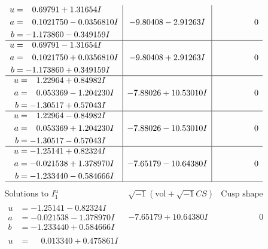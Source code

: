 \documentclass[1p]{elsarticle_modified}
\theoremstyle{definition}
\newcommand{\I}{\sqrt{-1}}
\begin{document}
$$\begin{array}{c|c|c}
\begin{aligned}
u &= \phantom{-}0.69791 + 1.31654 I \\
a &= \phantom{-}0.1021750 - 0.0356810 I \\
b &= -1.173860 - 0.349159 I\end{aligned}
 & -9.80408 - 2.91263 I & \phantom{-0.000000 } 0 \\ \hline\begin{aligned}
u &= \phantom{-}0.69791 - 1.31654 I \\
a &= \phantom{-}0.1021750 + 0.0356810 I \\
b &= -1.173860 + 0.349159 I\end{aligned}
 & -9.80408 + 2.91263 I & \phantom{-0.000000 } 0 \\ \hline\begin{aligned}
u &= \phantom{-}1.22964 + 0.84982 I \\
a &= \phantom{-}0.053369 - 1.204230 I \\
b &= -1.30517 + 0.57043 I\end{aligned}
 & -7.88026 + 10.53010 I & \phantom{-0.000000 } 0 \\ \hline\begin{aligned}
u &= \phantom{-}1.22964 - 0.84982 I \\
a &= \phantom{-}0.053369 + 1.204230 I \\
b &= -1.30517 - 0.57043 I\end{aligned}
 & -7.88026 - 10.53010 I & \phantom{-0.000000 } 0 \\ \hline\begin{aligned}
u &= -1.25141 + 0.82324 I \\
a &= -0.021538 + 1.378970 I \\
b &= -1.233440 - 0.584666 I\end{aligned}
 & -7.65179 - 10.64380 I & \phantom{-0.000000 } 0\\
 \hline 
 \end{array}$$\newpage$$\begin{array}{c|c|c}  
\text{Solutions to }I^u_{1}& \I (\text{vol} + \sqrt{-1}CS) & \text{Cusp shape}\\
 \hline 
\begin{aligned}
u &= -1.25141 - 0.82324 I \\
a &= -0.021538 - 1.378970 I \\
b &= -1.233440 + 0.584666 I\end{aligned}
 & -7.65179 + 10.64380 I & \phantom{-0.000000 } 0 \\ \hline\begin{aligned}
u &= \phantom{-}0.013340 + 0.475861 I \\

\end{aligned}
\end{array}$$
\end{document}
